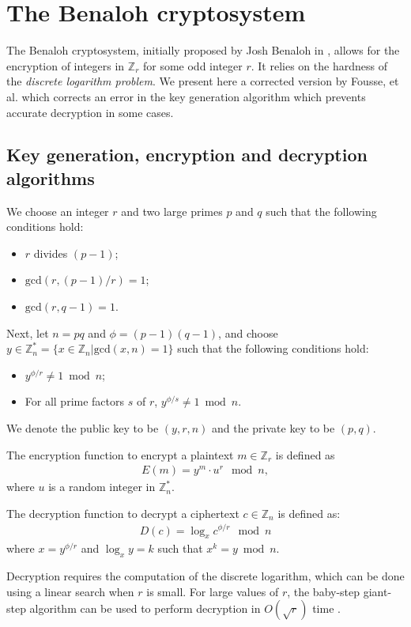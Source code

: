 \section{The Benaloh cryptosystem}
The Benaloh cryptosystem, initially proposed by Josh Benaloh in \cite{benaloh_dense_1994}, allows for the encryption of integers in $\mathbb{Z}_r$ for some odd integer $r$. It relies on the hardness of the \textit{discrete logarithm problem}. We present here a corrected version by Fousse, et al. \cite{fousse_benalohs_2010} which corrects an error in the key generation algorithm which prevents accurate decryption in some cases.

\subsection{Key generation, encryption and decryption algorithms}
We choose an integer $r$ and two large primes $p$ and $q$ such that the following conditions hold:
\begin{itemize}
  \item $r$ divides $(p-1)$;
  \item $\mathrm{gcd}(r,(p-1)/r)=1$;
  \item $\mathrm{gcd}(r,q-1)=1$.
\end{itemize}
Next, let $n=pq$ and $\phi = (p-1)(q-1)$, and choose $y\in \mathbb{Z}_n^* = \{ x \in \mathbb{Z}_n | \mathrm{gcd}(x,n)=1 \}$ such that the following conditions hold:
\begin{itemize}
  \item $y^{\phi/r}\neq 1 \bmod n$;
  \item For all prime factors $s$ of $r$, $y^{\phi/s}\neq 1 \bmod n$.
\end{itemize}
We denote the public key to be $(y,r,n)$ and the private key to be $(p,q)$.

The encryption function to encrypt a plaintext $m \in \mathbb{Z}_r$ is defined as
\begin{align*}
  E(m) = y^m \cdot u^r \mod{n},
\end{align*}
where $u$ is a random integer in $\mathbb{Z}_n^*$.

The decryption function to decrypt a ciphertext $c \in \mathbb{Z}_{n}$ is defined as:
\begin{align*}
  D(c) = \log_x{c^{\phi/r}} \mod n
\end{align*}
where $x = y^{\phi/r}$ and $\log_x{y} = k$ such that $x^k = y \bmod n$.

Decryption requires the computation of the discrete logarithm, which can be done using a linear search when $r$ is small. For large values of $r$, the baby-step giant-step algorithm can be used to perform decryption in $O(\sqrt{r})$ time \cite{benaloh_dense_1994}.

